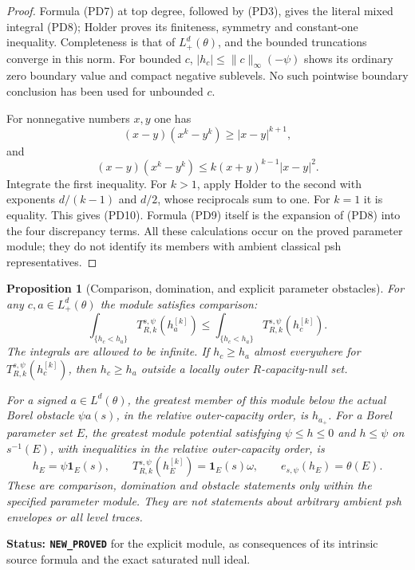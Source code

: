 \documentclass[11pt,a4paper]{article}
\numberwithin{equation}{section}
\newtheorem{proposition}[theorem]{Proposition}
\theoremstyle{definition}
\theoremstyle{remark}
\begin{document}
\begin{proof}
Formula (PD7) at top degree, followed by (PD3), gives
the literal mixed integral (PD8); Holder proves its
finiteness, symmetry and constant-one inequality.
Completeness is that of $L^d_+(\theta)$, and the bounded
truncations converge in this norm. For bounded $c$,
$|h_c|\leq\|c\|_\infty(-\psi)$ shows its ordinary
zero boundary value and compact negative sublevels.
No such pointwise boundary conclusion has been used
for unbounded $c$.

For nonnegative numbers $x,y$ one has
\[
 (x-y)(x^k-y^k)\geq |x-y|^{k+1},
\]
and
\[
 (x-y)(x^k-y^k)\leq
                  k(x+y)^{k-1}|x-y|^2.
\]
Integrate the first inequality. For $k>1$, apply Holder
to the second with exponents $d/(k-1)$ and $d/2$, whose
reciprocals sum to one. For $k=1$ it is equality.
This gives (PD10). Formula (PD9) itself is the expansion
of (PD8) into the four discrepancy terms. All these
calculations occur on the proved parameter module;
they do not identify its members with ambient classical
psh representatives.
\end{proof}

\begin{proposition}[Comparison, domination, and explicit parameter obstacles]
\label{prop:r12-parameter-comparison-domination}
For any $c,a\in L^d_+(\theta)$ the module satisfies comparison:
\[
 \int_{\{h_c<h_a\}} T^{s,\psi}_{R,k}(h_a^{[k]})
       \leq
 \int_{\{h_c<h_a\}} T^{s,\psi}_{R,k}(h_c^{[k]}).
 \tag{PD10a}
\]
The integrals are allowed to be infinite. If
$h_c\geq h_a$ almost everywhere for
$T^{s,\psi}_{R,k}(h_c^{[k]})$, then $h_c\geq h_a$
outside a locally outer $R$-capacity-null set.

For a signed $a\in L^d(\theta)$, the greatest member of this
module below the actual Borel obstacle $\psi a(s)$, in the
relative outer-capacity order, is
$h_{a_+}$. For a Borel parameter set $E$, the greatest module
potential satisfying $\psi\leq h\leq0$ and $h\leq\psi$ on
$s^{-1}(E)$, with inequalities in the relative outer-capacity
order, is
\[
             h_E=\psi\mathbf1_E(s),\qquad
             T^{s,\psi}_{R,k}(h_E^{[k]})=\mathbf1_E(s)\omega,
             \qquad e_{s,\psi}(h_E)=\theta(E).
 \tag{PD10b}
\]
These are comparison, domination and obstacle statements only
within the specified parameter module. They are not statements
about arbitrary ambient psh envelopes or all level traces.
\end{proposition}

\noindent\textbf{Status: \texttt{NEW\_PROVED}} for the explicit
module, as consequences of its intrinsic source formula and
the exact saturated null ideal.
\end{document}
